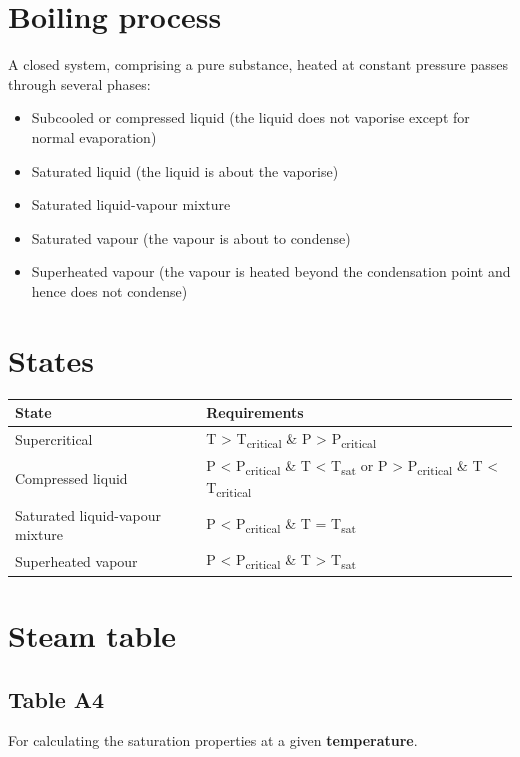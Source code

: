 \documentclass[11pt]{article}
\begin{document}
\section{Boiling process}
\label{sec:orga09bf44}
A closed system, comprising a pure substance, heated at constant pressure passes through several phases:
\begin{itemize}
\item Subcooled or compressed liquid (the liquid does not vaporise except for normal evaporation)
\item Saturated liquid (the liquid is about the vaporise)
\item Saturated liquid-vapour mixture
\item Saturated vapour (the vapour is about to condense)
\item Superheated vapour (the vapour is heated beyond the condensation point and hence does not condense)
\end{itemize}


\section{States}
\label{sec:orgcf2254a}
\begin{center}
\begin{tabular}{l|l}
State & Requirements\\[0pt]
\hline
Supercritical & T > T\textsubscript{critical} \& P > P\textsubscript{critical}\\[0pt]
Compressed liquid & P < P\textsubscript{critical} \& T < T\textsubscript{sat} or P > P\textsubscript{critical} \& T < T\textsubscript{critical}\\[0pt]
Saturated liquid-vapour mixture & P < P\textsubscript{critical} \& T = T\textsubscript{sat}\\[0pt]
Superheated vapour & P < P\textsubscript{critical} \& T > T\textsubscript{sat}\\[0pt]
\end{tabular}
\end{center}

\newpage

\section{Steam table}
\label{sec:org761e7f3}

\subsection{Table A4}
\label{sec:orgad09eb5}
For calculating the saturation properties at a given \textbf{temperature}.
\end{document}
